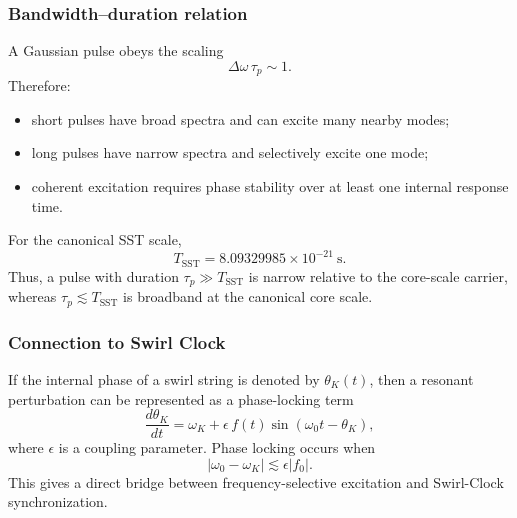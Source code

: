     \subsubsection*{Bandwidth--duration relation}
        
        A Gaussian pulse obeys the scaling
        \begin{equation}
            \Delta\omega\,\tau_p \sim 1.
            \label{eq:time_bandwidth_relation}
        \end{equation}
        Therefore:
        \begin{itemize}
            \item short pulses have broad spectra and can excite many nearby modes;
            \item long pulses have narrow spectra and selectively excite one mode;
            \item coherent excitation requires phase stability over at least one internal response time.
        \end{itemize}
        
        For the canonical SST scale,
        \[
            T_{\mathrm{SST}} = 8.09329985\times10^{-21}\ \mathrm{s}.
        \]
        Thus, a pulse with duration \(\tau_p\gg T_{\mathrm{SST}}\) is narrow relative to the core-scale carrier, whereas \(\tau_p\lesssim T_{\mathrm{SST}}\) is broadband at the canonical core scale.
    
    \subsubsection*{Connection to Swirl Clock}
        
        If the internal phase of a swirl string is denoted by \(\theta_K(t)\), then a resonant perturbation can be represented as a phase-locking term
        \begin{equation}
            \frac{d\theta_K}{dt}
            =
            \omega_K
            +
            \epsilon\,f(t)\sin(\omega_0 t-\theta_K),
            \label{eq:phase_locking_response}
        \end{equation}
        where \(\epsilon\) is a coupling parameter. Phase locking occurs when
        \begin{equation}
            |\omega_0-\omega_K| \lesssim \epsilon |f_0|.
            \label{eq:locking_condition}
        \end{equation}
        This gives a direct bridge between frequency-selective excitation and Swirl-Clock synchronization.
    
